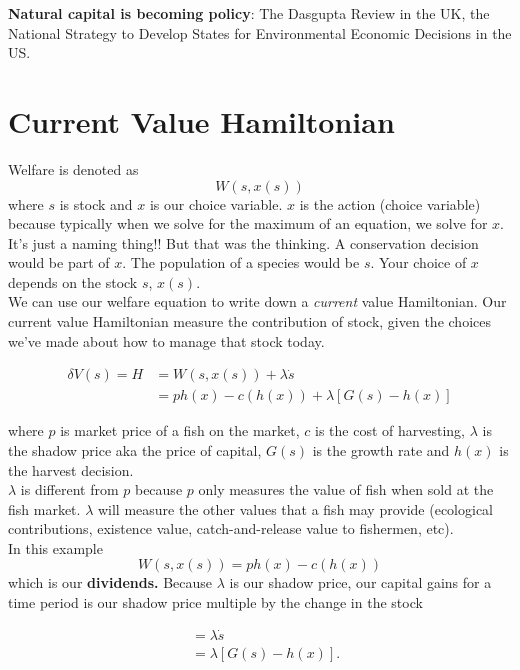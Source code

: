 \documentclass{article}
\begin{document}
\textbf{Natural capital is becoming policy}: The Dasgupta Review in the UK, the National Strategy to Develop States for Environmental Economic Decisions in the US. 

\section{Current Value Hamiltonian}
Welfare is denoted as
$$W(s, x(s)) $$
where $s$ is stock and $x$ is our choice variable. $x$ is the action (choice variable) because typically when we solve for the maximum of an equation, we solve for $x$. It's just a naming thing!! But that was the thinking.  A conservation decision would be part of $x$. The population of a species would be $s$. Your choice of $x$ depends on the stock $s$, $x(s)$. \\

We can use our welfare equation to write down a \textit{current} value Hamiltonian. Our current value Hamiltonian measure the contribution of stock, given the choices we've made about how to manage that stock today. 

\begin{align}
    \delta V(s) = H & = W(s, x(s)) + \lambda \dot s \label{cvh} \\
         & = p h(x) - c(h(x)) + \lambda [G(s) - h(x)]  
\end{align}





where $p$ is market price of a fish on the market, $c$ is the cost of harvesting, $\lambda$ is the shadow price aka the price of capital, $G(s)$ is the growth rate and $h(x)$ is the harvest decision. \\

$\lambda$ is different from $p$ because $p$ only measures the value of fish when sold at the fish market. $\lambda$ will measure the other values that a fish may provide (ecological contributions, existence value, catch-and-release value to fishermen, etc). \\

In this example
$$W(s, x(s)) = p h(x) - c(h(x)) $$
which is our \textbf{dividends.} Because $\lambda$ is our shadow price, our capital gains for a time period is our shadow price multiple by the change in the stock 

\begin{align}
    &= \lambda \dot s\\
   &=  \lambda [G(s) - h(x)].
\end{align}
\end{document}
